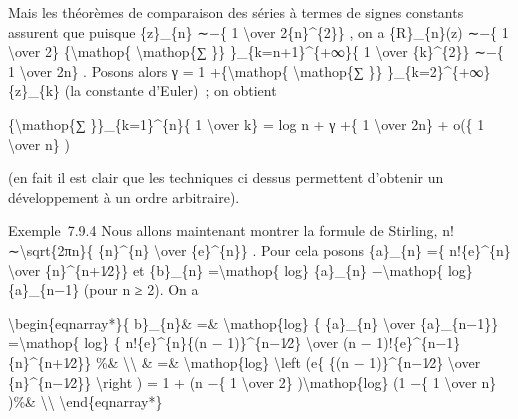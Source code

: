 \documentclass[]{article}
\begin{document}
Mais les théorèmes de comparaison des séries à termes de signes
constants assurent que puisque \{z\}\_\{n\} ∼−\{ 1 \textbackslash{}over
2\{n\}\^{}\{2\}\} , on a \{R\}\_\{n\}(z) ∼−\{ 1 \textbackslash{}over 2\}
\{\textbackslash{}mathop\{ \textbackslash{}mathop\{∑ \}\}
\}\_\{k=n+1\}\^{}\{+∞\}\{ 1 \textbackslash{}over \{k\}\^{}\{2\}\} ∼−\{ 1
\textbackslash{}over 2n\} . Posons alors γ = 1
+\{\textbackslash{}mathop\{ \textbackslash{}mathop\{∑ \}\}
\}\_\{k=2\}\^{}\{+∞\}\{z\}\_\{k\} (la constante d'Euler)~; on obtient

\{\textbackslash{}mathop\{∑ \}\}\_\{k=1\}\^{}\{n\}\{ 1
\textbackslash{}over k\} = log n + γ +\{ 1 \textbackslash{}over 2n\} +
o(\{ 1 \textbackslash{}over n\} )

(en fait il est clair que les techniques ci dessus permettent d'obtenir
un développement à un ordre arbitraire).

Exemple~7.9.4 Nous allons maintenant montrer la formule de Stirling, n!
∼\textbackslash{}sqrt\{2πn\}\{ \{n\}\^{}\{n\} \textbackslash{}over
\{e\}\^{}\{n\}\} . Pour cela posons \{a\}\_\{n\} =\{ n!\{e\}\^{}\{n\}
\textbackslash{}over \{n\}\^{}\{n+1∕2\}\} et \{b\}\_\{n\}
=\textbackslash{}mathop\{ log\} \{a\}\_\{n\} −\textbackslash{}mathop\{
log\} \{a\}\_\{n−1\} (pour n ≥ 2). On a

\textbackslash{}begin\{eqnarray*\}\{ b\}\_\{n\}\& =\&
\textbackslash{}mathop\{log\} \{ \{a\}\_\{n\} \textbackslash{}over
\{a\}\_\{n−1\}\} =\textbackslash{}mathop\{ log\} \{ n!\{e\}\^{}\{n\}\{(n
− 1)\}\^{}\{n−1∕2\} \textbackslash{}over (n −
1)!\{e\}\^{}\{n−1\}\{n\}\^{}\{n+1∕2\}\} \%\&
\textbackslash{}\textbackslash{} \& =\& \textbackslash{}mathop\{log\}
\textbackslash{}left (e\{ \{(n − 1)\}\^{}\{n−1∕2\} \textbackslash{}over
\{n\}\^{}\{n−1∕2\}\} \textbackslash{}right ) = 1 + (n −\{ 1
\textbackslash{}over 2\} )\textbackslash{}mathop\{log\} (1 −\{ 1
\textbackslash{}over n\} )\%\& \textbackslash{}\textbackslash{}
\textbackslash{}end\{eqnarray*\}
\end{document}
